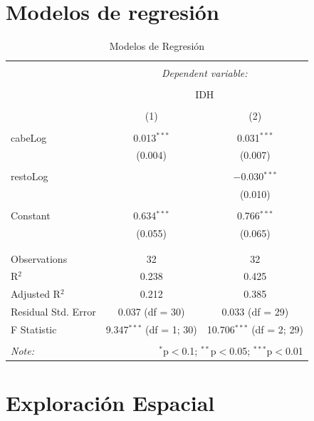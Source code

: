 \documentclass{article}
\begin{document}
\section{Modelos de regresión}
\begin{table}[!htbp] \centering 
  \caption{Modelos de Regresión} 
  \label{regresiones} 
\begin{tabular}{@{\extracolsep{5pt}}lcc} 
\\[-1.8ex]\hline 
\hline \\[-1.8ex] 
 & \multicolumn{2}{c}{\textit{Dependent variable:}} \\ 
\cline{2-3} 
\\[-1.8ex] & \multicolumn{2}{c}{IDH} \\ 
\\[-1.8ex] & (1) & (2)\\ 
\hline \\[-1.8ex] 
 cabeLog & 0.013$^{***}$ & 0.031$^{***}$ \\ 
  & (0.004) & (0.007) \\ 
  & & \\ 
 restoLog &  & $-$0.030$^{***}$ \\ 
  &  & (0.010) \\ 
  & & \\ 
 Constant & 0.634$^{***}$ & 0.766$^{***}$ \\ 
  & (0.055) & (0.065) \\ 
  & & \\ 
\hline \\[-1.8ex] 
Observations & 32 & 32 \\ 
R$^{2}$ & 0.238 & 0.425 \\ 
Adjusted R$^{2}$ & 0.212 & 0.385 \\ 
Residual Std. Error & 0.037 (df = 30) & 0.033 (df = 29) \\ 
F Statistic & 9.347$^{***}$ (df = 1; 30) & 10.706$^{***}$ (df = 2; 29) \\ 
\hline 
\hline \\[-1.8ex] 
\textit{Note:}  & \multicolumn{2}{r}{$^{*}$p$<$0.1; $^{**}$p$<$0.05; $^{***}$p$<$0.01} \\ 
\end{tabular} 
\end{table} 
\clearpage

\section{Exploración Espacial}
\end{document}
